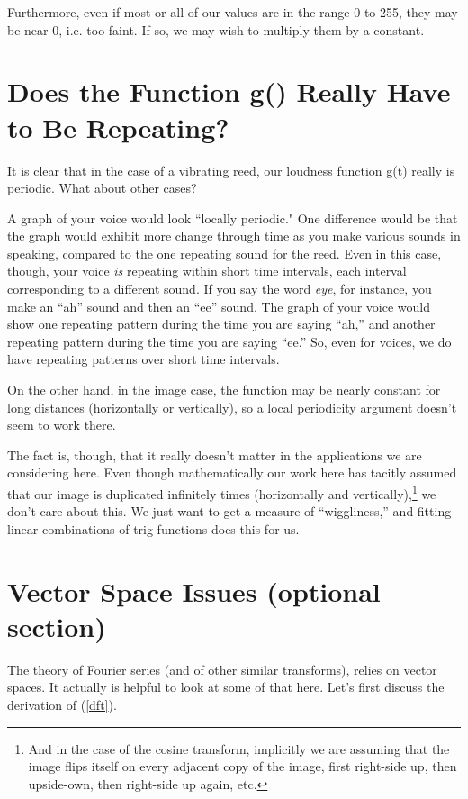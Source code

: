 Furthermore, even if most or all of our values are in the range 0 to
255, they may be near 0, i.e. too faint.  If so, we may wish to multiply
them by a constant.

\section{Does the Function g() Really Have to Be Repeating?}

It is clear that in the case of a vibrating reed, our loudness function
g(t) really is periodic.  What about other cases?

A graph of your voice would look ``locally periodic."  One difference
would be that the graph would exhibit more change through time as you
make various sounds in speaking, compared to the one repeating sound for
the reed.  Even in this case, though, your voice {\it is} repeating
within short time intervals, each interval corresponding to a different
sound.  If you say the word {\it eye}, for instance, you make an ``ah''
sound and then an ``ee'' sound.  The graph of your voice would show one
repeating pattern during the time you are saying ``ah,'' and another
repeating pattern during the time you are saying ``ee.''  So, even for
voices, we do have repeating patterns over short time intervals.

On the other hand, in the image case, the function may be nearly
constant for long distances (horizontally or vertically), so a local
periodicity argument doesn't seem to work there.

The fact is, though, that it really doesn't matter in the applications
we are considering here.  Even though mathematically our work here has
tacitly assumed that our image is duplicated infinitely times
(horizontally and vertically),\footnote{And in the case of the cosine
transform, implicitly we are assuming that the image flips itself on
every adjacent copy of the image, first right-side up, then upside-own,
then right-side up again, etc.} we don't care about this.  We just want
to get a measure of ``wiggliness,'' and fitting linear combinations of
trig functions does this for us.

\section{Vector Space Issues (optional section)} 
\label{vector}

The theory of Fourier series (and of other similar transforms), relies
on vector spaces.  It actually is helpful to look at some of that here.
Let's first discuss the derivation of (\ref{dft}).  

